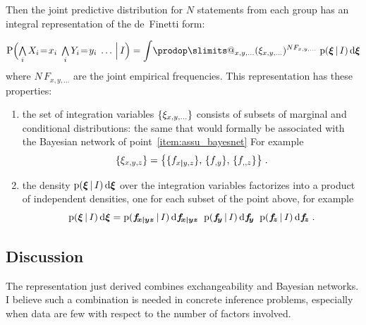 \documentclass[\ifafour a4paper,12pt,\else a5paper,10pt,\fi%
onecolumn,oneside,article,%
british%
]{memoir}
\makeatletter
\theoremstyle{remark}
\theoremstyle{innote}
\def\prod{\DOTSI\prodop\slimits@}
\newcommand*{\di}{\mathrm{d}}%
\newcommand*{\Land}{\mathop{\textstyle\bigwedge}}
\DeclarePairedDelimiter\set{\{}{\}}
\newcommand*{\pf}{\mathrm{p}}%
\newcommand*{\p}{\mathrm{P}}%
\renewcommand*{\|}[1][]{\nonscript\,#1\vert\nonscript\,\mathopen{}}
\newcommand*{\eq}{\mathrel{\!=\!}}
\renewcommand*{\=}{\TextOrMath\texteq\eq}
\newcommand*{\X}[1]{X_{#1}}
\newcommand*{\x}[1]{x_{#1}}
\newcommand*{\Y}[1]{Y_{#1}}
\newcommand*{\y}[1]{y_{#1}}
\newcommand*{\ff}[1]{f_{#1}}
\newcommand*{\ffb}[1]{\bm{f_{\!#1}}}
\newcommand*{\FF}[1]{F_{#1}}
\newcommand*{\bcond}[1][]{\nonscript\,#1\bm{\vert}\nonscript\;\mathopen{}}
\makeatother
\begin{document}
Then the joint predictive distribution for $N$ statements from each group
has an integral representation of the de~Finetti form:
\begin{framed}
  \begin{equation}
    \label{eq:general_form}
    \p\Bigl( \Land_{i}\X{i}\eq\x{i} \;  \Land_{i}\Y{i}\eq\y{i} \; \dotsc
  \|[\Big] I\Bigr)
     = %
    \int\!\prod_{x,y,\dotsc}
    (\xi_{x,y,\dotsc})^{N \FF{x,y,\dotsc}}\;%
    \pf(\bm{\xi}\|I)\,\di\bm{\xi} 
  \end{equation}
where $N\,\FF{x,y,\dotsc}$ are the joint empirical frequencies. This
representation has these properties:
  \begin{enumerate}[label=\Roman*.]
  \item the set of integration variables $\set{\xi_{x,y,\dotsc}}$ consists
    of subsets of marginal and conditional distributions: the same that
    would formally be associated with the Bayesian network of
    point~\ref{item:assu_bayesnet} For example
    \[\set{\xi_{x,y,z}} = \set[\big]{\set{\ff{x \bcond y,z}},\,
        \set{\ff{,y}},\, \set{\ff{,,z}}}\;.\]
  \item the density $\pf(\bm{\xi}\|I)\,\di\bm{\xi}$ over the integration
    variables factorizes into a product of independent densities, one for
    each subset of the point above, for example
    \[\pf(\bm{\xi}\|I)\,\di\bm{\xi} =
      \pf(\ffb{x \bcond y z}\|I)\,\di\ffb{x \bcond y z}\;\;
      \pf(\ffb{y}\|I)\,\di\ffb{y}\;\; \pf(\ffb{z}\|I)\,\di\ffb{z} \;.
    \]
  \end{enumerate}
\end{framed}

\subsection{Discussion}
\label{sec:disc_exchbayesnet}

The representation just derived combines exchangeability and Bayesian
networks. I believe such a combination is needed in concrete inference
problems, especially when data are few with respect to the number of
factors involved.
\end{document}
